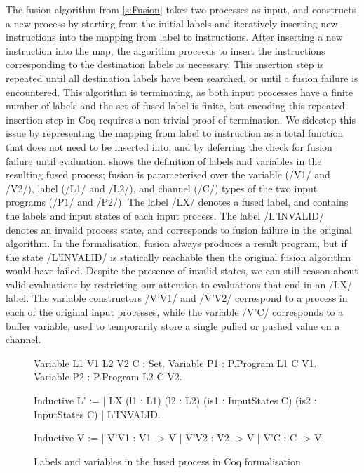 The fusion algorithm from \cref{s:Fusion} takes two processes as input, and constructs a new process by starting from the initial labels and iteratively inserting new instructions into the mapping from label to instructions.
After inserting a new instruction into the map, the algorithm proceeds to insert the instructions corresponding to the destination labels as necessary.
This insertion step is repeated until all destination labels have been searched, or until a fusion failure is encountered.
This algorithm is terminating, as both input processes have a finite number of labels and the set of fused label is finite, but encoding this repeated insertion step in Coq requires a non-trivial proof of termination.
We sidestep this issue by representing the mapping from label to instruction as a total function that does not need to be inserted into, and by deferring the check for fusion failure until evaluation.
 shows the definition of labels and variables in the resulting fused process; fusion is parameterised over the variable (\Hs/V1/ and \Hs/V2/), label (\Hs/L1/ and \Hs/L2/), and channel (\Hs/C/) types of the two input programs (\Hs/P1/ and \Hs/P2/).
The label \Hs/LX/ denotes a fused label, and contains the labels and input states of each input process.
The label \Hs/L'INVALID/ denotes an invalid process state, and corresponds to fusion failure in the original algorithm.
In the formalisation, fusion always produces a result program, but if the state \Hs/L'INVALID/ is statically reachable then the original fusion algorithm would have failed.
Despite the presence of invalid states, we can still reason about valid evaluations by restricting our attention to evaluations that end in an \Hs/LX/ label.
The variable constructors \Hs/V'V1/ and \Hs/V'V2/ correspond to a process in each of the original input processes, while the variable \Hs/V'C/ corresponds to a buffer variable, used to temporarily store a single pulled or pushed value on a channel.

\begin{figure}
\begin{coq}
Variable L1 V1 L2 V2 C : Set.
Variable P1 : P.Program L1 C V1.
Variable P2 : P.Program L2 C V2.

Inductive L' :=
  | LX (l1 : L1) (l2 : L2) (is1 : InputStates C) (is2 : InputStates C)
  | L'INVALID.

Inductive V :=
  | V'V1 : V1 -> V
  | V'V2 : V2 -> V
  | V'C : C -> V.
\end{coq}
\caption{Labels and variables in the fused process in Coq formalisation}
\label{figs/coq/fused-label}
\end{figure}

